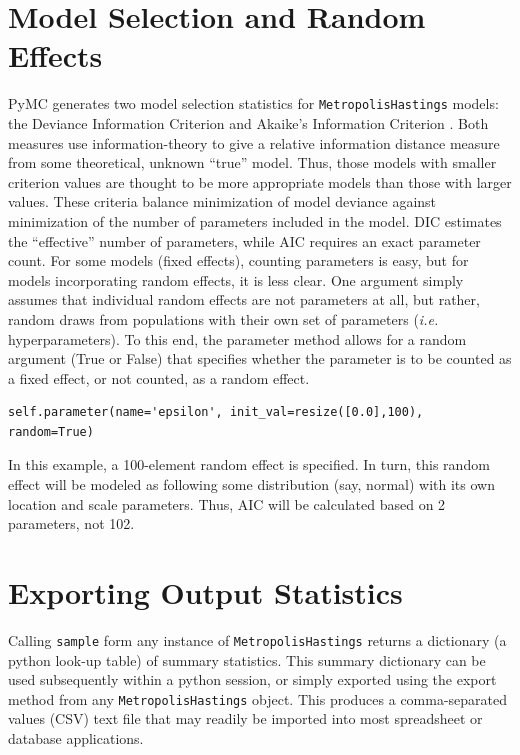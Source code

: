 \documentclass[]{book}
\begin{document}
\section{Model Selection and Random Effects}

PyMC generates two model selection statistics for \verb=MetropolisHastings= models: the Deviance Information Criterion \citep[DIC][]{Spiegelhalter:2002ma} and Akaike’s Information Criterion \citep[AIC][]{Burnham:2002ic}. Both measures use information-theory to give a relative information distance measure from some theoretical, unknown “true” model. Thus, those models with smaller criterion values are thought to be more appropriate models than those with larger values. These criteria balance minimization of model deviance against minimization of the number of parameters included in the model. DIC estimates the “effective” number of parameters, while AIC requires an exact parameter count. For some models (fixed effects), counting parameters is easy, but for models incorporating random effects, it is less clear. One argument simply assumes that individual random effects are not parameters at all, but rather, random draws from populations with their own set of parameters (\emph{i.e.} hyperparameters). To this end, the parameter method allows for a random argument (True or False) that specifies whether the parameter is to be counted as a fixed effect, or not counted, as a random effect.
\begin{verbatim}
self.parameter(name='epsilon', init_val=resize([0.0],100), random=True)
\end{verbatim}

In this example, a 100-element random effect is specified. In turn, this random effect will be modeled as following some distribution (say, normal) with its own location and scale parameters. Thus, AIC will be calculated based on 2 parameters, not 102.

\section{Exporting Output Statistics}

Calling \verb=sample= form any instance of \verb=MetropolisHastings= returns a dictionary (a python look-up table) of summary statistics. This summary dictionary can be used subsequently within a python session, or simply exported using the export method from any \verb=MetropolisHastings= object. This produces a comma-separated values (CSV) text file that may readily be imported into most spreadsheet or database applications.
\end{document}

